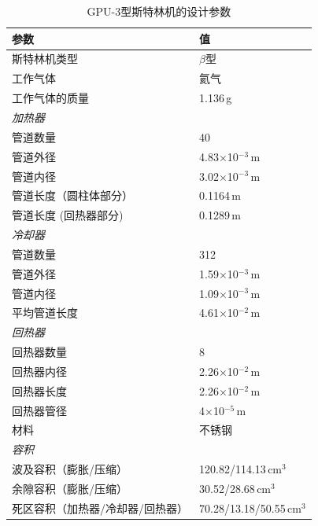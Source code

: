 \begin{table}[htbp]\footnotesize
\setlength{\abovecaptionskip}{-10pt}
	\caption{GPU-3型斯特林机的设计参数\cite{Babaelahi2015,Martini1983}}
	\begin{center}
	\begin{tabular}{ll}
		\toprule
		参数				&	值\\
		\midrule
		斯特林机类型					&	$\beta$型\\
		工作气体			&	氦气\\
		工作气体的质量	&	1.136\,g\\
		\emph{加热器}			&\\
		管道数量		&	40\\
		管道外径	&	4.83$\times$10$^{-3}\,\mathrm{m}$\\
		管道内径	&	3.02$\times$10$^{-3}\,\mathrm{m}$\\
		管道长度（圆柱体部分）		&	0.1164\,m\\
		管道长度 (回热器部分)		&	0.1289\,m\\
		\emph{冷却器}			&\\
		管道数量		&	312\\
		管道外径	&	1.59$\times$10$^{-3}\,\mathrm{m}$\\
		管道内径	&	1.09$\times$10$^{-3}\,\mathrm{m}$\\
		平均管道长度		&	4.61$\times$10$^{-2}\,\mathrm{m}$\\
		\emph{回热器}		&\\
		回热器数量	&	8\\
		回热器内径	&	2.26$\times$10$^{-2}\,\mathrm{m}$\\
		回热器长度		&	2.26$\times$10$^{-2}\,\mathrm{m}$\\
		回热器管径	&	4$\times$10$^{-5}\,\mathrm{m}$\\
		材料				&	不锈钢\\
		\emph{容积}			&\\
		波及容积（膨胀/压缩）	&	120.82/114.13\,$\mathrm{cm}^3$\\
		余隙容积（膨胀/压缩）	&	30.52/28.68\,$\mathrm{cm}^3$\\
		死区容积（加热器/冷却器/回热器）	&	70.28/13.18/50.55\,$\mathrm{cm}^3$\\
		\bottomrule
	\end{tabular}
	\end{center}
	\label{tab:GPU3parameters}
\end{table}

